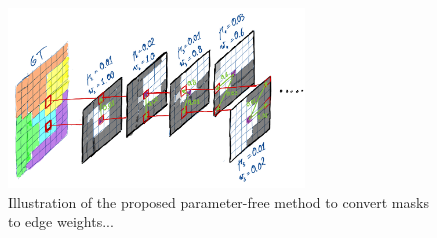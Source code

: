 
\begin{figure}[t]
\centering
        \includegraphics[width=0.7\textwidth]{./figs/alg_explaned.jpg} %
        \caption{Illustration of the proposed parameter-free method to convert \maskname masks to edge weights...}
    \label{fig:alg_explained}
\end{figure}
